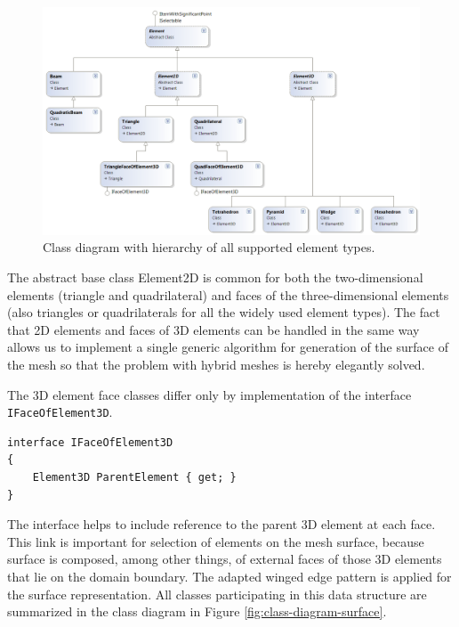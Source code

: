 \begin{figure}[H]
\centering
\includegraphics[width=\textwidth]{figures/appendix-mesh-visualization/figure2}
\decoRule
\caption[Class diagram of element types]{Class diagram with hierarchy of all supported element types.}
\label{fig:class-diagram-elements}
\end{figure}

The abstract base class Element2D is common for both the two-dimensional elements (triangle and quadrilateral) and faces of the three-dimensional elements (also triangles or quadrilaterals for all the widely used element types). The fact that 2D elements and faces of 3D elements can be handled in the same way allows us to implement a single generic algorithm for generation of the surface of the mesh so that the problem with hybrid meshes is hereby elegantly solved.

The 3D element face classes differ only by implementation of the interface \texttt{IFaceOfElement3D}.

\begin{lstlisting}
interface IFaceOfElement3D
{
	Element3D ParentElement { get; }
}
\end{lstlisting}

The interface helps to include reference to the parent 3D element at each face. This link is important for selection of elements on the mesh surface, because surface is composed, among other things, of external faces of those 3D elements that lie on the domain boundary. The adapted winged edge pattern is applied for the surface representation. All classes participating in this data structure are summarized in the class diagram in Figure \ref{fig:class-diagram-surface}.

